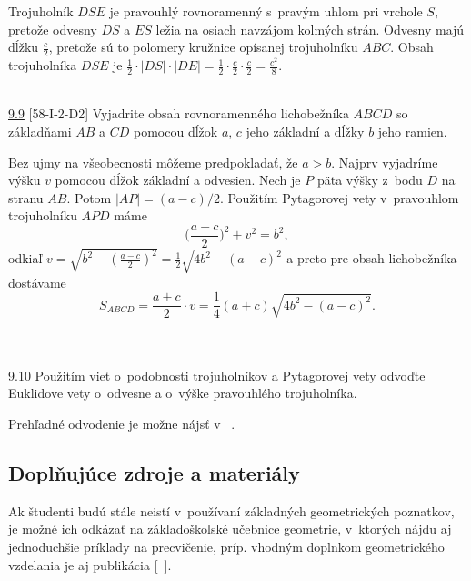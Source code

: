 \rie Trojuholník $DSE$ je pravouhlý rovnoramenný s~pravým uhlom pri vrchole $S$, pretože odvesny $DS$ a $ES$ ležia na osiach navzájom kolmých strán. Odvesny majú dĺžku $\frac{c}{2}$, pretože sú to polomery kružnice opísanej trojuholníku $ABC$. Obsah trojuholníka $DSE$ je $\frac{1}{2}\cdot|DS|\cdot |DE|=\frac{1}{2}\cdot \frac{c}{2}\cdot\frac{c}{2}=\frac{c^2}{8}.$ \\
\\
\begin{tcolorbox}[breakable,notitle,boxrule=0pt,colback=light-gray,colframe=light-gray]\ul{9.9} [58-I-2-D2] Vyjadrite obsah rovnoramenného lichobežníka $ABCD$ so základňami $AB$ a $CD$ pomocou dĺžok $a$, $c$ jeho základní a dĺžky $b$ jeho ramien.

\end{tcolorbox}

\rie Bez ujmy na všeobecnosti môžeme predpokladať, že $a>b$. Najprv vyjadríme výšku $v$ pomocou dĺžok základní a odvesien. Nech je $P$ päta výšky z~bodu $D$ na stranu $AB$. Potom $|AP|=(a-c)/2$. Použitím Pytagorovej vety v~pravouhlom trojuholníku $APD$ máme
$$\bigg(\frac{a-c}{2}\bigg)^2+v^2=b^2,$$
odkiaľ $v=\sqrt{b^2-(\frac{a-c}{2})^2}=\frac{1}{2}\sqrt{4b^2-(a-c)^2}$ a preto pre obsah lichobežníka dostávame $$S_{ABCD}=\frac{a+c}{2}\cdot v=\frac{1}{4}(a+c)\sqrt{4b^2-(a-c)^2}.$$\\
\\
\begin{tcolorbox}[breakable,notitle,boxrule=0pt,colback=light-gray,colframe=light-gray]\ul{9.10} Použitím viet o~podobnosti trojuholníkov a Pytagorovej vety odvoďte Euklidove vety o~odvesne a o~výške pravouhlého trojuholníka.
\end{tcolorbox}
\rie Prehľadné odvodenie je možne nájsť v ~\cite{kadlecek1996}.

\subsection*{Doplňujúce zdroje a materiály}
Ak študenti budú stále neistí v~používaní základných geometrických poznatkov, je možné ich odkázať na základoškolské učebnice geometrie, v~ktorých nájdu aj jednoduchšie príklady na precvičenie, príp. vhodným doplnkom geometrického vzdelania je aj publikácia [~\cite{kadlecek1996}].
